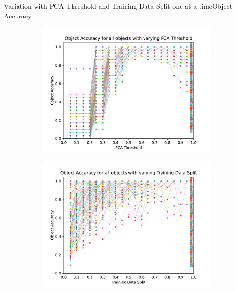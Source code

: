 \documentclass[aspectratio=169, handout, 10pt, hyperref=colorlinks]{beamer}
\begin{document}
\begin{frame}{Variation with PCA Threshold and Training Data Split one at a time}{Object Accuracy}
    \begin{figure}
        \centering
        \begin{subfigure}{0.48\linewidth}
            \centering
            \includegraphics[width=\linewidth]{pca/object_accuracy_all_objects.pdf}
        \end{subfigure}
        \begin{subfigure}{0.48\linewidth}
            \centering
            \includegraphics[width=\linewidth]{tds/object_accuracy_all_objects.pdf}
        \end{subfigure}
    \end{figure}
\end{frame}
\end{document}
